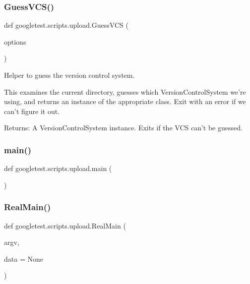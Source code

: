 \subsubsection{\texorpdfstring{GuessVCS()}{GuessVCS()}}
{\footnotesize\ttfamily def googletest.\+scripts.\+upload.\+Guess\+V\+CS (\begin{DoxyParamCaption}\item[{}]{options }\end{DoxyParamCaption})}

\begin{DoxyVerb}Helper to guess the version control system.

This examines the current directory, guesses which VersionControlSystem
we're using, and returns an instance of the appropriate class.  Exit with an
error if we can't figure it out.

Returns:
  A VersionControlSystem instance. Exits if the VCS can't be guessed.
\end{DoxyVerb}
 \mbox{\label{namespacegoogletest_1_1scripts_1_1upload_a6fad2cb34a945e725b3265589a6f7a36}} 
\subsubsection{\texorpdfstring{main()}{main()}}
{\footnotesize\ttfamily def googletest.\+scripts.\+upload.\+main (\begin{DoxyParamCaption}{ }\end{DoxyParamCaption})}

\mbox{\label{namespacegoogletest_1_1scripts_1_1upload_a183984cddc5c98e6dcf10730b3d4f599}} 
\subsubsection{\texorpdfstring{RealMain()}{RealMain()}}
{\footnotesize\ttfamily def googletest.\+scripts.\+upload.\+Real\+Main (\begin{DoxyParamCaption}\item[{}]{argv,  }\item[{}]{data = {\ttfamily None} }\end{DoxyParamCaption})}

